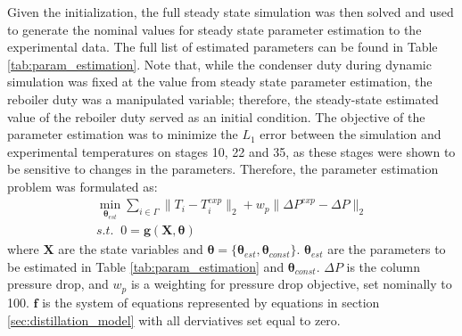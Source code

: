 Given the initialization, the full steady state simulation was then solved and used to generate the nominal values for steady state parameter estimation to the experimental data. The full list of estimated parameters can be found in Table \ref{tab:param_estimation}. Note that, while the condenser duty during dynamic simulation was fixed at the value from steady state parameter estimation, the reboiler duty was a manipulated variable; therefore, the steady-state estimated value of the reboiler duty served as an initial condition. The objective of the parameter estimation was to minimize the $L_1$ error between the simulation and experimental temperatures on stages 10, 22 and 35, as these stages were shown to be sensitive to changes in the parameters. Therefore, the parameter estimation problem was formulated as:
\begin{subequations}
    \begin{align}
        \min_{\boldsymbol \theta_{est}} \sum_{i \in \Gamma} \lVert T_i-T_i^{exp}\rVert_2 + w_p \lVert \Delta P^{exp} - \Delta P \rVert_2 \\
        s.t. \;\; 0 = \mathbf g(\mathbf X, \boldsymbol \theta)
    \end{align}
\end{subequations}
where $\mathbf X$ are the state variables and $\boldsymbol \theta = \{\boldsymbol \theta_{est}, \boldsymbol \theta_{const} \}$.  $\boldsymbol \theta_{est}$ are the parameters to be estimated in Table \ref{tab:param_estimation} and $\boldsymbol \theta_{const}$. $\Delta P$ is the column pressure drop, and $w_p$ is a weighting for pressure drop objective, set nominally to 100.  $\mathbf f$ is the system of equations represented by equations in section \ref{sec:distillation_model} with all derviatives set equal to zero. 
